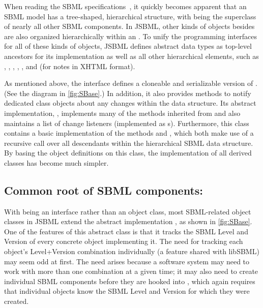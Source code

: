 When reading the SBML specifications~\citep{Hucka2003, Hucka2008,
  Hucka2010a},  it quickly becomes apparent that
an SBML model has a tree-shaped, hierarchical structure, with \SBase being
the superclass of nearly all other SBML components. In JSBML, other kinds of
objects besides \SBase are also organized hierarchically within an
\SBMLDocument.  To unify the programming interfaces for all of these kinds
of objects, JSBML defines abstract data types as top-level ancestors for
its \SBase implementation as well as all other hierarchical elements, such
as \Annotation, \ASTNode, \Creator, \CVTerm, \History, and \XMLNode (for
notes in XHTML  format).

As mentioned above, the interface \TreeNodeWithChangeSupport defines a
cloneable and serializable version of \TreeNode. (See the diagram in
\vref{fig:SBase}.) In addition, it also provides methods to notify
dedicated \TreeNodeChangeListener class objects about any changes within
the data structure. Its abstract implementation, \AbstractTreeNode,
implements many of the methods inherited from \TreeNodeWithChangeSupport
and also maintains a list of change listeners (implemented as
\TreeNodeChangeListener{}s). Furthermore, this class contains a basic
implementation of the methods  and , which both
make use of a recursive call over all descendants within the hierarchical
SBML data structure. By basing the object definitions on this class, the
implementation of all derived classes has become much simpler.


\subsection{Common root of SBML components: }

With \SBase being an interface rather than an object class, most SBML-related
object classes in JSBML extend the abstract implementation \AbstractSBase, as
shown in \vref{fig:SBase}.  One of the features of this abstract class is
that it tracks the SBML Level and Version of every concrete object
implementing it.  The need for tracking each object's Level+Version
combination individually (a feature shared with libSBML) may seem odd at
first.  The need arises because a software system may need to work with more
than one combination at a given time; it may also need to create individual
SBML components before they are hooked into \SBMLDocument, which again
requires that individual objects know the SBML Level and Version for which
they were created.



